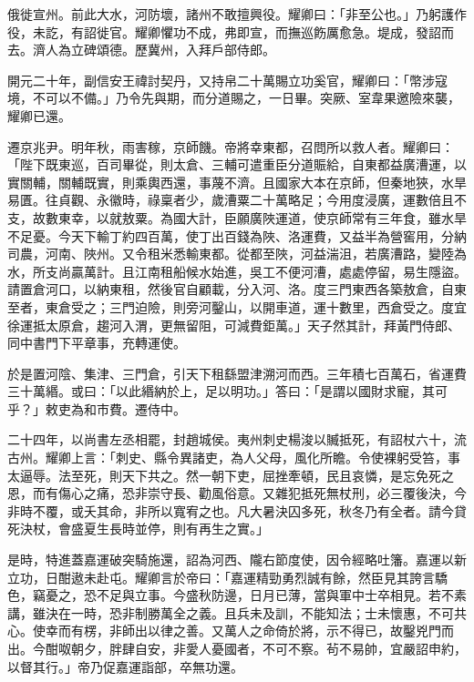 \begin{pinyinscope}
 俄徙宣州。前此大水，河防壞，諸州不敢擅興役。耀卿曰：「非至公也。」乃躬護作役，未訖，有詔徙官。耀卿懼功不成，弗即宣，而撫巡飭厲愈急。堤成，發詔而去。濟人為立碑頌德。歷冀州，入拜戶部侍郎。



 開元二十年，副信安王禕討契丹，又持帛二十萬賜立功奚官，耀卿曰：「幣涉寇境，不可以不備。」乃令先與期，而分道賜之，一日畢。突厥、室韋果邀險來襲，耀卿已還。



 遷京兆尹。明年秋，雨害稼，京師饑。帝將幸東都，召問所以救人者。耀卿曰：「陛下既東巡，百司畢從，則太倉、三輔可遣重臣分道賑給，自東都益廣漕運，以實關輔，關輔既實，則乘輿西還，事蔑不濟。且國家大本在京師，但秦地狹，水旱易匱。往貞觀、永徽時，祿稟者少，歲漕粟二十萬略足；今用度浸廣，運數倍且不支，故數東幸，以就敖粟。為國大計，臣願廣陜運道，使京師常有三年食，雖水旱不足憂。今天下輸丁約四百萬，使丁出百錢為陜、洛運費，又益半為營窖用，分納司農，河南、陜州。又令租米悉輸東都。從都至陜，河益湍沮，若廣漕路，變陸為水，所支尚贏萬計。且江南租船候水始進，吳工不便河漕，處處停留，易生隱盜。請置倉河口，以納東租，然後官自顧載，分入河、洛。度三門東西各築敖倉，自東至者，東倉受之；三門迫險，則旁河鑿山，以開車道，運十數里，西倉受之。度宜徐運抵太原倉，趨河入渭，更無留阻，可減費鉅萬。」天子然其計，拜黃門侍郎、同中書門下平章事，充轉運使。



 於是置河陰、集津、三門倉，引天下租繇盟津溯河而西。三年積七百萬石，省運費三十萬緡。或曰：「以此緡納於上，足以明功。」答曰：「是謂以國財求寵，其可乎？」敕吏為和市費。遷侍中。



 二十四年，以尚書左丞相罷，封趙城侯。夷州刺史楊浚以贓抵死，有詔杖六十，流古州。耀卿上言：「刺史、縣令異諸吏，為人父母，風化所瞻。令使裸躬受笞，事太逼辱。法至死，則天下共之。然一朝下吏，屈挫牽頓，民且哀憐，是忘免死之恩，而有傷心之痛，恐非崇守長、勸風俗意。又雜犯抵死無杖刑，必三覆後決，今非時不覆，或夭其命，非所以寬宥之也。凡大暑決囚多死，秋冬乃有全者。請今貸死決杖，會盛夏生長時並停，則有再生之實。」



 是時，特進蓋嘉運破突騎施還，詔為河西、隴右節度使，因令經略吐籓。嘉運以新立功，日酣遨未赴屯。耀卿言於帝曰：「嘉運精勁勇烈誠有餘，然臣見其誇言驕色，竊憂之，恐不足與立事。今盛秋防邊，日月已薄，當與軍中士卒相見。若不素講，雖決在一時，恐非制勝萬全之義。且兵未及訓，不能知法；士未懷惠，不可共心。使幸而有楞，非師出以律之善。又萬人之命倚於將，示不得已，故鑿兇門而出。今酣呶朝夕，胖肆自安，非愛人憂國者，不可不察。茍不易帥，宜嚴詔申約，以督其行。」帝乃促嘉運詣部，卒無功還。




\end{pinyinscope}
